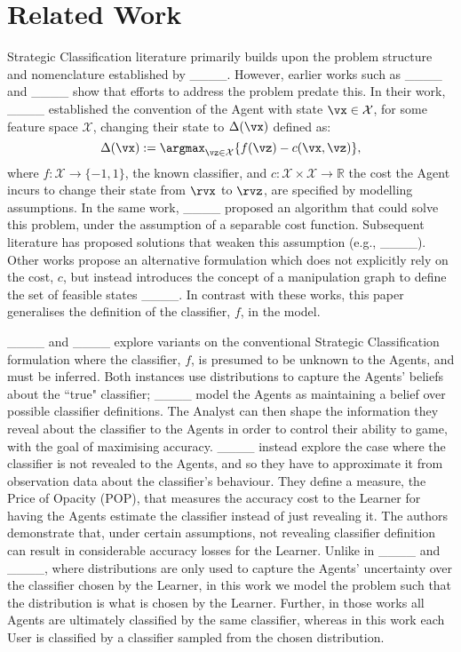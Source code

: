 \section{Related Work}
\label{related_work}
Strategic Classification literature primarily builds upon the problem structure and nomenclature established by ____. However, earlier works such as ____ and ____ show that efforts to address the problem predate this. In their work, ____ established the convention of the Agent with state $\vx \in \mathcal{X}$, for some feature space $\mathcal{X}$, changing their state to $\Delta(\vx)$ defined as:
\begin{equation*}
    \Delta(\vx) := \argmax_{\vz \in \mathcal{X}} \{f(\vz) - c(\vx,\vz)\},
\end{equation*}
where $f: \mathcal{X} \rightarrow \{-1,1\}$, the known classifier, and $c: \mathcal{X} \times \mathcal{X} \rightarrow \mathbb{R}$ the cost the Agent incurs to change their state from $\rvx$ to $\rvz$, are specified by modelling assumptions. In the same work, ____ proposed an algorithm that could solve this problem, under the assumption of a separable cost function. Subsequent literature has proposed solutions that weaken this assumption (e.g., ____). Other works propose an alternative formulation which does not explicitly rely on the cost, $c$, but instead introduces the concept of a manipulation graph to define the set of feasible states ____. In contrast with these works, this paper generalises the definition of the classifier, $f$, in the model.

____ and ____ explore variants on the conventional Strategic Classification formulation where the classifier, $f$, is presumed to be unknown to the Agents, and must be inferred. Both instances use distributions to capture the Agents' beliefs about the ``true" classifier; ____ model the Agents as maintaining a belief over possible classifier definitions. The Analyst can then shape the information they reveal about the classifier to the Agents in order to control their ability to game, with the goal of maximising accuracy. ____ instead explore the case where the classifier is not revealed to the Agents, and so they have to approximate it from observation data about the classifier's behaviour. They define a measure, the Price of Opacity (POP), that measures the accuracy cost to the Learner for having the Agents estimate the classifier instead of just revealing it. The authors demonstrate that, under certain assumptions, not revealing classifier definition can result in considerable accuracy losses for the Learner. Unlike in ____ and ____, where distributions are only used to capture the Agents' uncertainty over the classifier chosen by the Learner, in this work we model the problem such that the distribution is what is chosen by the Learner. Further, in those works all Agents are ultimately classified by the same classifier, whereas in this work each User is classified by a classifier sampled from the chosen distribution.

